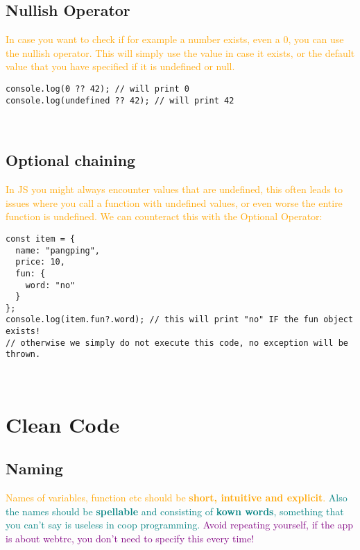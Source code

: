 \documentclass[main.tex,fontsize=6pt,paper=a4,paper=landscape,DIV=calc,]{scrartcl}
\begin{document}
\begin{multicols*}{4}
\subsection{Nullish Operator}  
\textcolor{orange}{In case you want to check if for example a number exists, even a 0, you can use the nullish operator.\newline
This will simply use the value in case it exists, or the default value that you have specified if it is undefined or null.}
\begin{lstlisting}
console.log(0 ?? 42); // will print 0 
console.log(undefined ?? 42); // will print 42
\end{lstlisting}
\, \newline


\subsection{Optional chaining}  
\textcolor{orange}{In JS you might always encounter values that are undefined, this often leads to issues where you call a function with undefined values, or even worse the entire function is undefined.\newline
We can counteract this with the Optional Operator:}
\begin{lstlisting}
const item = {
  name: "pangping",
  price: 10, 
  fun: {
    word: "no"
  }
};
console.log(item.fun?.word); // this will print "no" IF the fun object exists!
// otherwise we simply do not execute this code, no exception will be thrown.
\end{lstlisting}
\, \newline


\section{Clean Code}

\subsection{Naming}  
\textcolor{orange}{Names of variables, function etc should be \textbf{short, intuitive and explicit}.}\newline
\textcolor{teal}{Also the names should be \textbf{spellable} and consisting of \textbf{kown words}, something that you can't say is useless in coop programming.}\newline
\textcolor{purple}{Avoid repeating yourself, if the app is about webtrc, you don't need to specify this every time!}


\end{multicols*}
\end{document}
